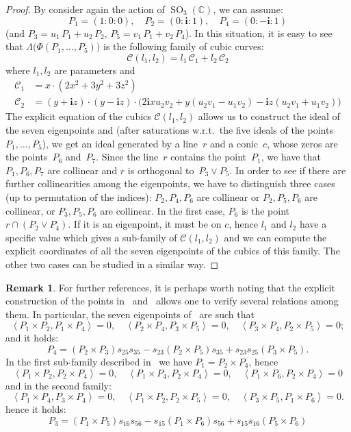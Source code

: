 \documentclass{amsart}
\theoremstyle{plain}
\theoremstyle{definition}
\newtheorem{rmk}[lemma]{Remark}
\newcommand{\C}{\mathbb{C}}
\newcommand{\SO}{\operatorname{SO}}
\newcommand{\scl}[2]{\left\langle {#1}, {#2} \right\rangle}
\newcommand{\iii}{\textbf{i}}
\begin{document}
\begin{proof}
By consider again the action of $\SO_3(\C)$, we can assume:
%
\[
  P_1 = (1: 0: 0), \quad
  P_2 = (0: \iii: 1), \quad
  P_4 = (0: -\iii: 1)
\]
%
(and $P_3 = u_1 \, P_1 + u_2 \, P_2$, $P_5 = v_1 \, P_1 + v_2 \, P_4$). 
In this situation, it
is easy to see that $\Lambda\bigl(\Phi(P_1, \dots, P_5)\bigr)$
is the following family of cubic curves:
%
\[
  \mathcal{C}(l_1, l_2) = l_1 \, \mathcal{C}_1 + l_2 \, \mathcal{C}_2
\]
%
where $l_1, l_2$ are parameters and
%
\begin{align*}
  \mathcal{C}_1 & = x \cdot \left(2x^{2} + 3 y^{2} + 3 z^{2}\right)\\
  \mathcal{C}_2 & = (y + \iii z) \cdot (y - \iii z)
  \cdot \bigl(2 \iii x u_{2} v_{2} + y (u_{2} v_{1}- u_{1} v_{2})
  - \iii z (u_{2} v_{1} + u_{1} v_{2})\bigr)
\end{align*}
%
The explicit equation of the cubics $\mathcal{C}(l_1, l_2)$ allows us to
construct the ideal of the seven eigenpoints and (after
saturations w.r.t.\ the five ideals of the points $P_1, \dotsc, P_5$),
we get an ideal generated by a line~$r$ and a conic~$c$, whose zeros are
the points~$P_6$ and~$P_7$. Since the line~$r$ contains the point~$P_1$,
we have that $P_1, P_6, P_7$ are collinear and $r$ is orthogonal to~$P_3 \vee P_5$.
In order to see if there are further collinearities among the
eigenpoints, we have to distinguish three cases (up to permutation
of the indices): $P_2, P_4, P_6$ are collinear or $P_2, P_5, P_6$ are
collinear, or $P_3, P_5, P_6$ are collinear. In the first case, $P_6$
is the point $r \cap (P_2\vee P_4)$. If it is an eigenpoint, it must be
on $c$, hence $l_1$ and $l_2$ have a specific value which gives a sub-family
of $\mathcal{C}(l_1, l_2)$ and we can compute the explicit coordinates of
all the seven eigenpoints of the cubics of this family. The other two
cases can be studied in a similar way.
\end{proof}
\begin{rmk}
\label{rmk:three_orthog} For further references, it is perhaps worth noting that the explicit 
construction of the 
points in~ and~ allows one to verify
several relations among them. In particular, the seven eigenpoints
of~ are such that
\[
\scl{P_1\times P_2}{P_1 \times P_4}=0, \quad 
\scl{P_2\times P_4}{P_3 \times P_5}=0, \quad 
\scl{P_3\times P_4}{P_2 \times P_5}=0;
\]
and it holds:
\[
P_4 = (P_2\times P_3)s_{25}s_{35}-s_{23}(P_2\times P_5)s_{35}+ s_{23}s_{25}(P_3\times P_5).
\]
In the first sub-family described in~ we have 
$P_1 = P_2 \times P_4$, hence 
\[
\scl{P_1\times P_2}{P_2 \times P_4}=0, \quad 
\scl{P_1\times P_4}{P_2 \times P_4}=0, \quad 
\scl{P_1\times P_6}{P_2 \times P_4}=0
\]
and in the second family:
\[
\scl{P_1\times P_4}{P_3 \times P_4}=0, \quad 
\scl{P_1\times P_2}{P_2 \times P_5}=0, \quad 
\scl{P_3\times P_5}{P_1 \times P_6}=0.
\]
hence it holds:
\[
P_3 = (P_1 \times P_5)s_{16}s_{56}-s_{15}(P_1\times P_6)s_{56}+s_{15}s_{16}(P_5 \times P_6)
\]
\end{rmk}
\end{document}
